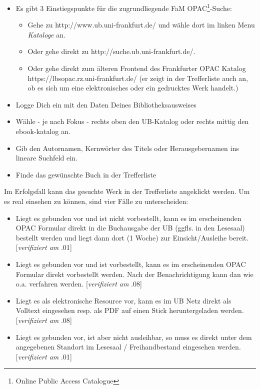 \documentclass[DIV=calc,BCOR=5mm,11pt,headings=small,oneside,abstract=false, toc=bib]{scrartcl}
\begin{document}
\begin{itemize}
  \item Es gibt 3 Einstiegspunkte für die zugrundliegende FaM
  OPAC\footnote{Online Public Access Catalogue}-Suche:
  \begin{itemize}
  \item Gehe zu {\ttfamily http://www.ub.uni-frankfurt.de/} und wähle dort
  im linken Menu \emph{Kataloge} an.
  \item Oder gehe direkt zu {\ttfamily http://suche.ub.uni-frankfurt.de/}.
  \item Oder gehe direkt zum älteren Frontend des
  Frankfurter OPAC Katalog {\ttfamily https://lbsopac.rz.uni-frankfurt.de/} (er
  zeigt in der Trefferliste auch an, ob es sich um eine elektronisches oder ein
  gedrucktes Werk handelt.)
  \end{itemize}
  \item Logge Dich ein mit den Daten Deines Bibliotheksausweises
  \item Wähle - je nach Fokus - rechts oben den UB-Katalog oder rechts mittig
  den ebook-katalog an.
  \item Gib den Autornamen, Kernwörter des Titels oder Herausgebernamen ins
  lineare Suchfeld ein.
  \item Finde das gewünschte Buch in der Trefferliste
\end{itemize}

Im Erfolgsfall kann das gesuchte Werk in der Trefferliste angeklickt werden. Um
es real einsehen zu können, sind vier Fälle zu unterscheiden:
\begin{itemize}
  \item Liegt es gebunden vor und ist nicht vorbestellt, kann es im
  erscheinenden OPAC Formular direkt in die Buchausgabe der UB (ggfls. in den
  Lesesaal) bestellt werden und liegt dann dort (1 Woche) zur
  Einsicht/Ausleihe bereit. [\emph{verifiziert am} {.01}]
  \item Liegt es gebunden vor und ist vorbestellt, kann es im erscheinenden OPAC
  Formular direkt vorbestellt werden. Nach der Benachrichtigung kann dan wie
  o.a. verfahren werden.  [\emph{verifiziert am} {.08}]
  \item Liegt es als elektronische Resource vor, kann es im UB Netz direkt als
  Volltext eingesehen resp. als PDF auf einen Stick heruntergeladen werden. 
  [\emph{verifiziert am} {.08}]
  \item Liegt es gebunden vor, ist aber nicht ausleihbar, so muss es direkt
  unter dem angegebenen Standort im Lesesaal / Freihandbestand eingesehen werden. 
  [\emph{verifiziert am} {.01}]
\end{itemize}
\end{document}
